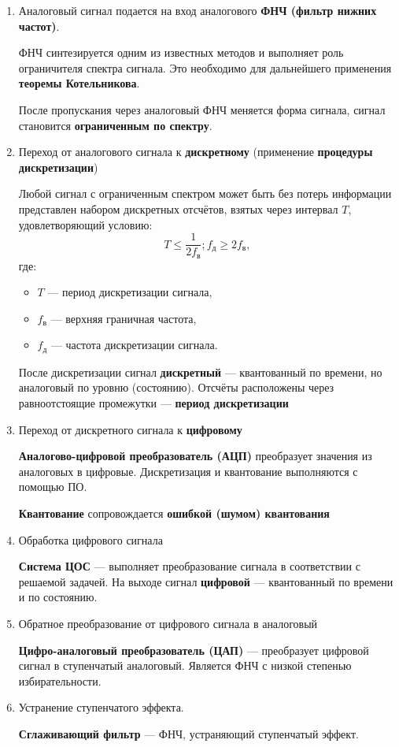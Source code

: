 \documentclass[a4paper, 14pt]{extarticle}
\begin{document}
\begin{enumerate}
    \item Аналоговый сигнал подается на вход аналогового \textbf{ФНЧ (фильтр нижних частот)}.

        ФНЧ синтезируется одним из известных методов и выполняет роль ограничителя спектра сигнала. Это необходимо для дальнейшего применения \textbf{теоремы Котельникова}.

        После пропускания через аналоговый ФНЧ меняется форма сигнала, сигнал становится \textbf{ограниченным по спектру}.
    \item Переход от аналогового сигнала к \textbf{дискретному} (применение \textbf{процедуры дискретизации})
        \begin{tcolorbox}[title=Теорема Котельникова]
            Любой сигнал с ограниченным спектром может быть без потерь информации представлен набором дискретных отсчётов, взятых через интервал $T$, удовлетворяющий условию:
            \begin{equation*}
                T \le \frac{1}{2f_\text{в}}; f_\text{д} \ge 2f_\text{в},
            \end{equation*}
            где:
            \begin{itemize}
                \item $T$ --- период дискретизации сигнала,
                \item $f_\text{в} $ --- верхняя граничная частота,
                \item $f_\text{д}$ --- частота дискретизации сигнала.
            \end{itemize}

            После дискретизации сигнал \textbf{дискретный} --- квантованный по времени, но аналоговый по уровню (состоянию). Отсчёты расположены через равноотстоящие промежутки --- \textbf{период дискретизации}

        \end{tcolorbox}
    \item Переход от дискретного сигнала к \textbf{цифровому}

        \textbf{Аналогово-цифровой преобразователь (АЦП)} преобразует значения из аналоговых в цифровые. Дискретизация и квантование выполняются с помощью ПО.

        \textbf{Квантование} сопровождается \textbf{ошибкой (шумом) квантования}
    \item Обработка цифрового сигнала

        \textbf{Система ЦОС} --- выполняет преобразование сигнала в соответствии с решаемой задачей. На выходе сигнал \textbf{цифровой} --- квантованный по времени и по состоянию.


    \item Обратное преобразование от цифрового сигнала в аналоговый

        \textbf{Цифро-аналоговый преобразователь (ЦАП)} --- преобразует цифровой сигнал в ступенчатый аналоговый. Является ФНЧ с низкой степенью избирательности.
    \item Устранение ступенчатого эффекта.

        \textbf{Сглаживающий фильтр} --- ФНЧ, устраняющий ступенчатый эффект.
\end{enumerate}
\end{document}

